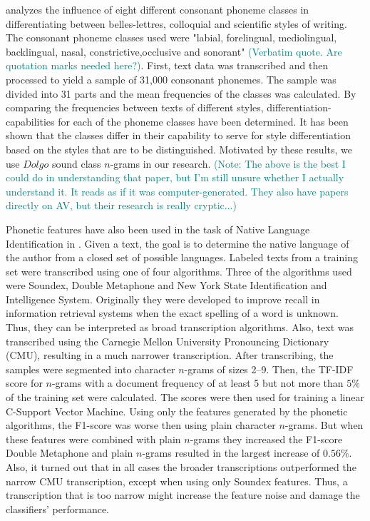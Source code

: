 \cite{khomytska2018authorship} analyzes the influence of eight different consonant phoneme classes in differentiating between belles-lettres, colloquial and scientific styles of writing.
The consonant phoneme classes used were "labial, forelingual, mediolingual, backlingual, nasal, constrictive,occlusive and sonorant" \textcolor{teal}{(Verbatim quote. Are quotation marks needed here?)}.
First, text data was transcribed and then processed to yield a sample of 31,000 consonant phonemes.
The sample was divided into 31 parts and the mean frequencies of the classes was calculated.
By comparing the frequencies between texts of different styles, differentiation-capabilities for each of the phoneme classes have been determined.
It has been shown that the classes differ in their capability to serve for style differentiation based on the styles that are to be distinguished.
Motivated by these results, we use $Dolgo$ sound class $n$-grams in our research.
\textcolor{teal}{(Note: The above is the best I could do in understanding that paper, but I'm still unsure whether I actually understand it.
It reads as if it was computer-generated.
They also have papers directly on AV, but their research is really cryptic...)}

Phonetic features have also been used in the task of Native Language Identification in \cite{smiley2017native}.
Given a text, the goal is to determine the native language of the author from a closed set of possible languages.
Labeled texts from a training set were transcribed using one of four algorithms.
Three of the algorithms used were Soundex, Double Metaphone and New York State Identification and Intelligence System.
Originally they were developed to improve recall in information retrieval systems when the exact spelling of a word is unknown.
Thus, they can be interpreted as broad transcription algorithms.
Also, text was transcribed using the Carnegie Mellon University Pronouncing Dictionary (CMU), resulting in a much narrower transcription.
After transcribing, the samples were segmented into character $n$-grams of sizes 2--9.
Then, the TF-IDF score for $n$-grams with a document frequency of at least 5 but not more than $5\%$ of the training set were calculated.
The scores were then used for training a linear C-Support Vector Machine.
Using only the features generated by the phonetic algorithms, the F1-score was worse then using plain character $n$-grams.
But when these features were combined with plain $n$-grams they increased the F1-score
Double Metaphone and plain $n$-grams resulted in the largest increase of $0.56\%$.
Also, it turned out that in all cases the broader transcriptions outperformed the narrow CMU transcription, except when using only Soundex features.
Thus, a transcription that is too narrow might increase the feature noise and damage the classifiers' performance.


